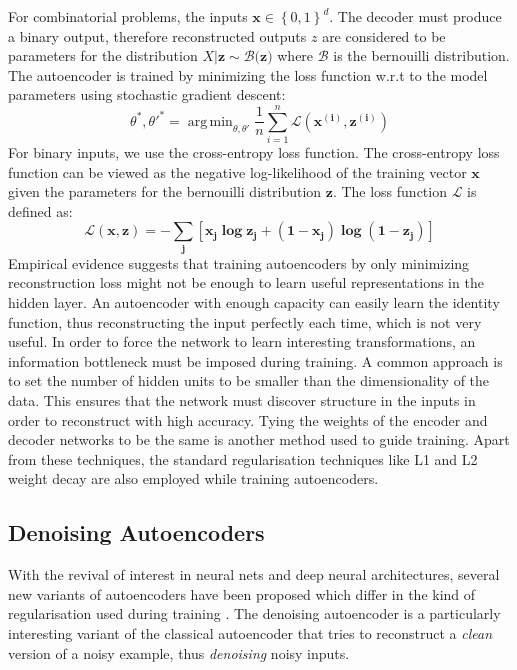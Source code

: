 \documentclass[runningheads,a4paper]{llncs}
\DeclareMathOperator*{\argmin}{arg\,min}
\begin{document}
For combinatorial problems, the inputs $\mathbf{x} \in \left\{ 0,1 \right\}^d$. The decoder must produce a binary output, therefore reconstructed outputs $z$ are considered to be parameters for the distribution  $X|\mathbf{z} \sim \mathcal{B(\mathbf{z}})$ where $\mathcal{B}$ is the bernouilli distribution. The autoencoder is trained by minimizing the loss function w.r.t to the model parameters using stochastic gradient descent:
$$ \theta^{*},\theta'^{*} = \argmin_{\theta,\theta'}{\frac{1}{n}}\sum_{i=1}^{n}\mathcal{L}(\mathbf {x^{(i)},z^{(i)}})$$
For binary inputs, we use the cross-entropy loss function. The cross-entropy loss function can be viewed as the negative log-likelihood of the training vector $\mathbf{x}$ given the parameters for the bernouilli distribution $\mathbf{z}$. The loss function $\mathcal{L}$ is defined as:
$$ \mathbf{\mathcal{L}(x,z) = -\sum_{j}[x_{j} \log z_{j} + (1 - x_{j})\log {(1-z_{j})}]}$$ 
Empirical evidence suggests that training autoencoders by only minimizing reconstruction loss might not be enough to learn useful representations in the hidden layer. An autoencoder with enough capacity can easily learn the identity function, thus reconstructing the input perfectly each time, which is not very useful. In order to force the network to learn interesting transformations, an information bottleneck must be imposed during training. A common approach is to set the number of hidden units to be smaller than the dimensionality of the data. This ensures that the network must discover structure in the inputs in order to reconstruct with high accuracy. Tying the weights of the encoder and decoder networks to be the same is another method used to guide training. Apart from these techniques, the standard regularisation techniques like L1 and L2 weight \cite{bishop1995neural} decay are also employed while training autoencoders. 

\subsection{Denoising Autoencoders}

With the revival of interest in neural nets and deep neural architectures, several new variants of autoencoders have been proposed which differ in the kind of regularisation used during training \cite{vincent2010stacked,rifai2011contractive}. The denoising autoencoder is a particularly interesting variant of the classical autoencoder that tries to reconstruct a \textit{clean} version of a noisy example, thus \textit{denoising} noisy inputs. 
\end{document}
